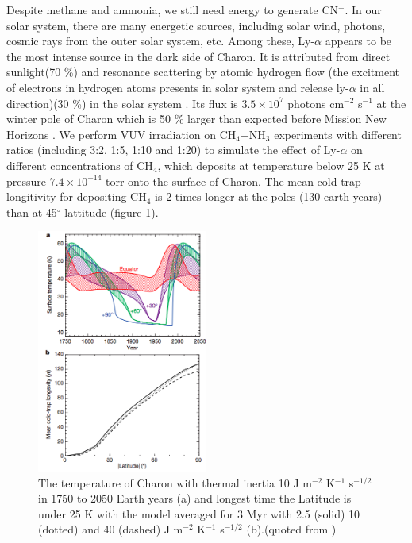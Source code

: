 Despite methane and ammonia, we still need energy to generate CN$^-$. In our solar system, there are many energetic sources, including solar wind, photons, cosmic rays from the outer solar system, etc. Among these, Ly-$\alpha$ appears to be the most intense source in the dark side of Charon. It is attributed from direct sunlight(70 \%) and resonance scattering by atomic hydrogen flow (the excitment of electrons in hydrogen atoms presents in solar system and release ly-$\alpha$ in all direction)(30 \%) in the solar system \cite{grundy2016formation}. Its flux is $3.5 \times 10^7$ photons cm$^{-2}$ s$^{-1}$ at the winter pole of Charon \cite{grundy2016formation} which is 50 \% larger than expected before Mission New Horizons \cite{gladstone2015lyalpha}. We perform VUV irradiation on CH$_4$+NH$_3$ experiments with different ratios (including 3:2, 1:5, 1:10 and 1:20) to simulate the effect of Ly-$\alpha$ on different concentrations of CH$_4$, which deposits at temperature below 25 K at pressure $7.4 \times 10^{-14}$ torr onto the surface of Charon. The mean cold-trap longitivity for depositing CH$_4$ is 2 times longer at the poles (130 earth years) than at 45$^{\circ}$ lattitude \cite{grundy2016formation} (figure \ref{fig:Charon_thermal}).\\

\begin{figure}
\centering
\includegraphics[width=0.5\textwidth]{figures/chapter1/thermal.png}
\caption{The temperature of Charon with thermal inertia 10 J m$^{-2}$ K$^{-1}$ s$^{-1/2}$ in 1750 to 2050 Earth years (a) and longest time the Latitude is under 25 K with the model averaged for 3 Myr with 2.5 (solid) 10 (dotted) and 40 (dashed) J m$^{-2}$ K$^{-1}$ s$^{-1/2}$ (b).(quoted from \cite{grundy2016formation})}
\label{fig:Charon_thermal}
\end{figure}

